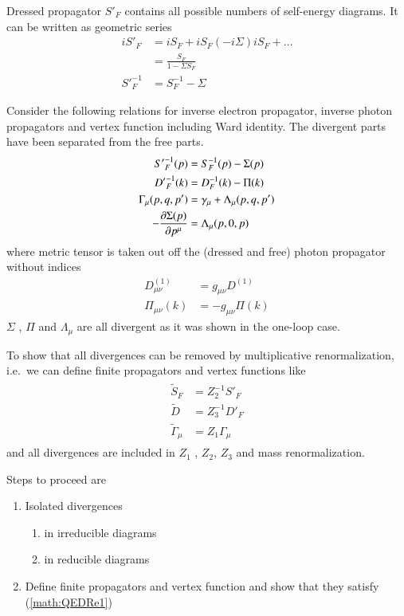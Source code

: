 Dressed propagator $S'_F$ contains all possible numbers of self-energy diagrams. It can be written as geometric series
\begin{align*}
   i S'_F  &= iS_F + iS_F (-i\Sigma) iS_F + \dots \\
         &= \frac{S_F}{1 - \Sigma S_F} \\
   {S'}_F^{-1} &= S_F^{-1} - \Sigma
\end{align*}

Consider the following relations for inverse electron propagator, inverse photon propagators and vertex function including Ward identity. The divergent parts have been separated from the free parts.
\begin{align}
\begin{split}
    {S'}_F^{-1} (p) &= S_F^{-1}(p) - \Sigma(p)  \\
   {D'}_F^{-1}(k) &= D_F^{-1}(k) - \Pi (k) \\
   \Gamma_\mu (p, q, p')  &= \gamma_\mu + \Lambda_\mu(p, q, p') \\
   - \pdv{\Sigma(p)}{p^\mu} &= \Lambda_\mu (p,0,p)
\end{split}\label{math:QEDRe1}
\end{align}
where metric tensor is taken out off the (dressed and free) photon propagator without indices 
\begin{align*}
   D_{\mu\nu}^{(1)} &= g_{\mu\nu} D^{(1)}\\
   \Pi_{\mu\nu} (k) &= - g_{\mu\nu} \Pi(k)
\end{align*}
$\Sigma$ , $\Pi$ and $\Lambda_\mu$ are all divergent as it was shown in the one-loop case.

To show that all divergences can be removed by multiplicative renormalization, i.e.~we can define finite propagators and vertex functions like
\begin{align}
   \begin{split}
      \tilde{S}_F &= Z_2^{-1} S'_F \\
      \tilde{D} &= Z_3^{-1} D'_F \\
      \tilde{\Gamma}_\mu &= Z_1 \Gamma_\mu
   \end{split} \label{math:QEDRe2}
\end{align}
and all divergences are included in $Z_1$ , $Z_2$, $Z_3$ and mass renormalization.

Steps to proceed are
\begin{enumerate}
   \item Isolated divergences
      \begin{enumerate}
         \item in irreducible diagrams \label{item:step1a}
         \item in reducible diagrams\label{item:step1b}
      \end{enumerate}
   \item Define finite propagators and vertex function and show that they satisfy (\ref{math:QEDRe1}) \label{item:step2}
\end{enumerate}


